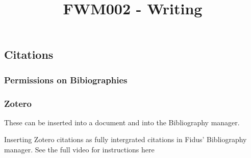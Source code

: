 \documentclass{article}
\begin{document}
\title{FWM002 - Writing }

\maketitle


\subsection{Citations}\label{H5773217}



\subsubsection{Permissions on Bibiographies}\label{H1368393}



\subsubsection{Zotero}\label{H899131}



These can be inserted into a document and into the Bibliography manager.


Inserting Zotero citations as fully intergrated citations in Fidus' Bibliography manager. See the full video for instructions here \autocite{technische_universitat_munchen_fidus_nodate}





\printbibliography[title={Literaturverzeichnis}]
\end{document}
